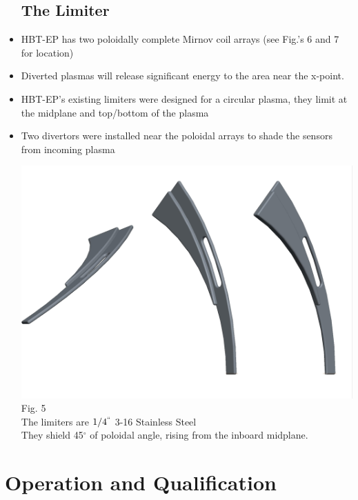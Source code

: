 \documentclass{article}
\begin{document}
\begin{multicols}{5}
\begin{itemize}
\subsection{The Limiter}
\item HBT-EP has two poloidally complete Mirnov coil arrays (see Fig.'s 6 and 7 for location)
\item Diverted plasmas will release significant energy to the area near the x-point.
\item HBT-EP's existing limiters were designed for a circular plasma, they limit at the midplane and top/bottom of the plasma
\item Two divertors were installed near the poloidal arrays to shade the sensors from incoming plasma\\
\begin{center}
\includegraphics[width=0.5\columnwidth]{strike_point_limiter_cropped.pdf}\\
Fig. 5\\
The limiters are $1/4^{``}$ 3-16 Stainless Steel\\
They shield 45$^\circ$ of poloidal angle, rising from the inboard midplane.
\end{center}
\end{itemize}
\columnbreak
\section{Operation and Qualification}

\end{multicols}
\end{document}
